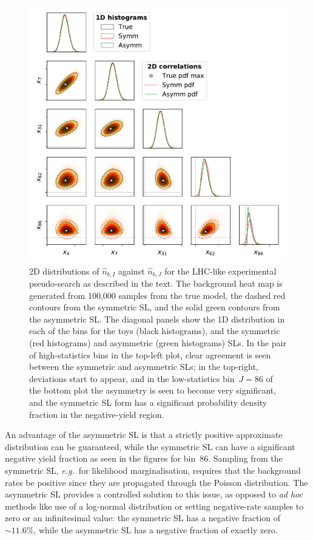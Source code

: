 \documentclass[11pt]{article}
\def\eg{{\it e.g.}}
\begin{document}
\begin{figure}[t]  \centering
  \includegraphics[width=\textwidth]{figures/plotmatrix}
  \caption{2D distributions of $\hat{n}_{b,I}$ against $\hat{n}_{b,J}$ for the LHC-like 
    experimental pseudo-search  
    as described in the text. The
    background heat map is generated from 100,000 samples from the true 
    model, the dashed red contours from the symmetric SL, and the solid
    green contours from the asymmetric SL. The diagonal panels show the
    1D distribution in each of the bins for the toys (black histograms), and the
    symmetric (red histograms) and asymmetric (green histograms) SLs.
    In the pair of
    high-statistics bins in the top-left plot, clear agreement is seen between
    the symmetric and asymmetric  SLs; in the top-right, deviations start to
    appear, and in the low-statistics bin~$J=86$ of the bottom plot the
    asymmetry is seen to become very significant, and the symmetric  SL form has a
    significant probability density fraction in the negative-yield region.}
  \label{fig:distributions2d}
\end{figure}


An advantage of the asymmetric SL is that a strictly positive
approximate distribution can be guaranteed, while the symmetric SL can have a
significant negative yield fraction as seen in the figures for bin~86. Sampling
from the symmetric SL, \eg\ for likelihood marginalisation, requires that the
background rates be positive since they are propagated through the Poisson
distribution. The asymmetric SL provides a controlled solution to this issue,
as opposed to \emph{ad hoc} methods like use of a log-normal distribution or
setting negative-rate samples to zero or an infinitesimal value: the symmetric SL has a negative fraction of $\sim\!11.6\%$, while the
asymmetric SL has a negative fraction of exactly zero.
\end{document}
